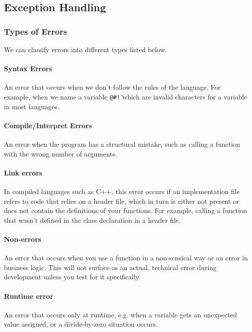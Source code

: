 \subsection{Exception Handling}

\subsubsection{Types of Errors}

We can classify errors into different types listed below.

\paragraph{Syntax Errors} An error that occurs when we don't follow the rules of the language. For example, when we name a variable \texttt{@\#!\=} which are invalid characters for a variable in most languages.

\paragraph{Compile/Interpret Errors} An error when the program has a structural mistake, such as calling a function with the wrong number of arguments.

\paragraph{Link errors} In compiled languages such as C++, this error occurs if an implementation file refers to code that relies on a header file, which in turn is either not present or does not contain the definitions of your functions. For example, calling a function that wasn't defined in the class declaration in a header file.

\paragraph{Non-errors} An error that occurs when you use a function in a non-sensical way or an error in business logic. This will not surface as an actual, technical error during development unless you test for it specifically.

\paragraph{Runtime error} An error that occurs only at runtime, e.g. when a variable gets an unexpected value assigned, or a divide-by-zero situation occurs.


